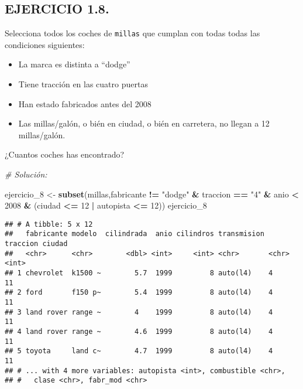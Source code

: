\documentclass[]{article}
\newenvironment{Shaded}{\begin{snugshade}}{\end{snugshade}}
\newcommand{\CommentTok}[1]{\textcolor[rgb]{0.56,0.35,0.01}{\textit{#1}}}
\newcommand{\DecValTok}[1]{\textcolor[rgb]{0.00,0.00,0.81}{#1}}
\newcommand{\KeywordTok}[1]{\textcolor[rgb]{0.13,0.29,0.53}{\textbf{#1}}}
\newcommand{\NormalTok}[1]{#1}
\newcommand{\OperatorTok}[1]{\textcolor[rgb]{0.81,0.36,0.00}{\textbf{#1}}}
\newcommand{\StringTok}[1]{\textcolor[rgb]{0.31,0.60,0.02}{#1}}
\providecommand{\tightlist}{%
  \setlength{\itemsep}{0pt}\setlength{\parskip}{0pt}}
\begin{document}
\hypertarget{ejercicio-1.8.}{%
\subsection{EJERCICIO 1.8.}\label{ejercicio-1.8.}}

Selecciona todos los coches de \texttt{millas} que cumplan con todas
todas las condiciones siguientes:

\begin{itemize}
\tightlist
\item
  La marca es distinta a ``dodge''
\item
  Tiene tracción en las cuatro puertas
\item
  Han estado fabricados antes del 2008
\item
  Las millas/galón, o bién en ciudad, o bién en carretera, no llegan a
  12 millas/galón.
\end{itemize}

¿Cuantos coches has encontrado?

\begin{Shaded}
\begin{Highlighting}[]
\CommentTok{# Solución:}

\NormalTok{ejercicio_}\DecValTok{8}\NormalTok{ <-}\StringTok{ }\KeywordTok{subset}\NormalTok{(millas,fabricante }\OperatorTok{!=}\StringTok{ "dodge"} \OperatorTok{&}\StringTok{ }\NormalTok{traccion }\OperatorTok{==}\StringTok{ "4"} \OperatorTok{&}\StringTok{ }\NormalTok{anio }\OperatorTok{<}\StringTok{ }\DecValTok{2008} \OperatorTok{&}\StringTok{ }\NormalTok{(ciudad }\OperatorTok{<=}\StringTok{ }\DecValTok{12} \OperatorTok{|}\StringTok{ }\NormalTok{autopista }\OperatorTok{<=}\StringTok{ }\DecValTok{12}\NormalTok{))}
\NormalTok{ejercicio_}\DecValTok{8}
\end{Highlighting}
\end{Shaded}

\begin{verbatim}
## # A tibble: 5 x 12
##   fabricante modelo  cilindrada  anio cilindros transmision traccion ciudad
##   <chr>      <chr>        <dbl> <int>     <int> <chr>       <chr>     <int>
## 1 chevrolet  k1500 ~        5.7  1999         8 auto(l4)    4            11
## 2 ford       f150 p~        5.4  1999         8 auto(l4)    4            11
## 3 land rover range ~        4    1999         8 auto(l4)    4            11
## 4 land rover range ~        4.6  1999         8 auto(l4)    4            11
## 5 toyota     land c~        4.7  1999         8 auto(l4)    4            11
## # ... with 4 more variables: autopista <int>, combustible <chr>,
## #   clase <chr>, fabr_mod <chr>
\end{verbatim}
\end{document}
